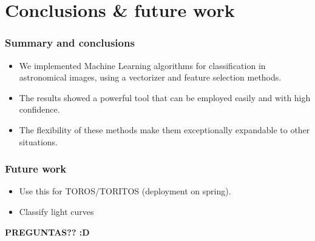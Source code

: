 \documentclass[10pt]{beamer}
\begin{document}
\section{Conclusions \& future work}
\frame{\tableofcontents[ 
    currentsection, 
    sectionstyle=show/hide, 
    sectionstyle=show/shaded, 
    ]}
\begin{frame}%
\frametitle{Summary and conclusions}
\begin{itemize}[<+->]
\item We implemented Machine Learning algorithms for classification in astronomical
images, using a vectorizer and feature selection methods.
\item The results showed a powerful tool that can be employed easily and with high confidence.
\item The flexibility of these methods make them exceptionally expandable to other situations.
\end{itemize}
\end{frame}
\begin{frame}\frametitle{Future work}
 \begin{itemize}
  \item Use this for TOROS/TORITOS (deployment on spring).
  \item Classify light curves
\end{itemize}
\begin{center}
\pause
\textbf{PREGUNTAS?? :D}
\end{center}
\end{frame}
\end{document}

